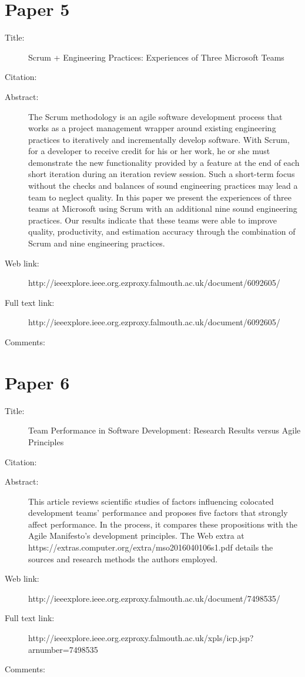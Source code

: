 \documentclass{scrartcl}
\begin{document}
\section*{Paper 5}
\begin{description}
\item[Title:] Scrum + Engineering Practices: Experiences of Three Microsoft Teams
\item[Citation:] \cite{bibtex_key}
\item[Abstract:] The Scrum methodology is an agile software development process that works as a project management wrapper around existing engineering practices to iteratively and incrementally develop software. With Scrum, for a developer to receive credit for his or her work, he or she must demonstrate the new functionality provided by a feature at the end of each short iteration during an iteration review session. Such a short-term focus without the checks and balances of sound engineering practices may lead a team to neglect quality. In this paper we present the experiences of three teams at Microsoft using Scrum with an additional nine sound engineering practices. Our results indicate that these teams were able to improve quality, productivity, and estimation accuracy through the combination of Scrum and nine engineering practices.
\item[Web link:] http://ieeexplore.ieee.org.ezproxy.falmouth.ac.uk/document/6092605/
\item[Full text link:] http://ieeexplore.ieee.org.ezproxy.falmouth.ac.uk/document/6092605/
\item[Comments:] 
\end{description}

\section*{Paper 6}
\begin{description}
\item[Title:] Team Performance in Software Development: Research Results versus Agile Principles
\item[Citation:] \cite{bibtex_key}
\item[Abstract:] This article reviews scientific studies of factors influencing colocated development teams' performance and proposes five factors that strongly affect performance. In the process, it compares these propositions with the Agile Manifesto's development principles. The Web extra at https://extras.computer.org/extra/mso2016040106s1.pdf details the sources and research methods the authors employed.
\item[Web link:] http://ieeexplore.ieee.org.ezproxy.falmouth.ac.uk/document/7498535/
\item[Full text link:] http://ieeexplore.ieee.org.ezproxy.falmouth.ac.uk/xpls/icp.jsp?arnumber=7498535
\item[Comments:] 
\end{description}



\end{document}
